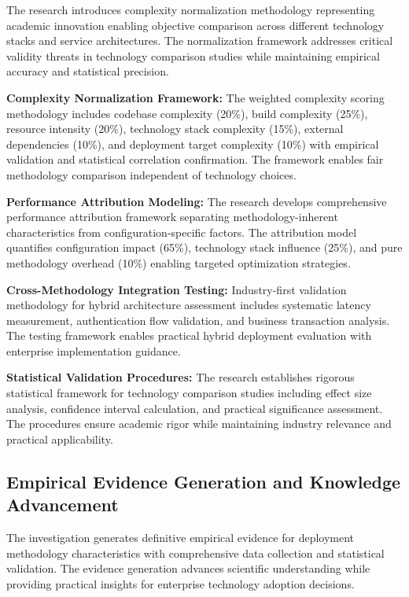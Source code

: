 The research introduces complexity normalization methodology representing academic innovation enabling objective comparison across different technology stacks and service architectures. The normalization framework addresses critical validity threats in technology comparison studies while maintaining empirical accuracy and statistical precision.

\textbf{Complexity Normalization Framework:}
The weighted complexity scoring methodology includes codebase complexity (20\%), build complexity (25\%), resource intensity (20\%), technology stack complexity (15\%), external dependencies (10\%), and deployment target complexity (10\%) with empirical validation and statistical correlation confirmation. The framework enables fair methodology comparison independent of technology choices.

\textbf{Performance Attribution Modeling:}
The research develops comprehensive performance attribution framework separating methodology-inherent characteristics from configuration-specific factors. The attribution model quantifies configuration impact (65\%), technology stack influence (25\%), and pure methodology overhead (10\%) enabling targeted optimization strategies.

\textbf{Cross-Methodology Integration Testing:}
Industry-first validation methodology for hybrid architecture assessment includes systematic latency measurement, authentication flow validation, and business transaction analysis. The testing framework enables practical hybrid deployment evaluation with enterprise implementation guidance.

\textbf{Statistical Validation Procedures:}
The research establishes rigorous statistical framework for technology comparison studies including effect size analysis, confidence interval calculation, and practical significance assessment. The procedures ensure academic rigor while maintaining industry relevance and practical applicability.

\subsection{Empirical Evidence Generation and Knowledge Advancement}
\label{subsec:empirical_evidence}

The investigation generates definitive empirical evidence for deployment methodology characteristics with comprehensive data collection and statistical validation. The evidence generation advances scientific understanding while providing practical insights for enterprise technology adoption decisions.

